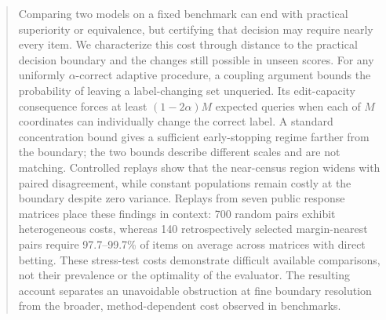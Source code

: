 \begin{abstract}
Comparing two models on a fixed benchmark can end with practical superiority or equivalence, but certifying that decision may require nearly every item. We characterize this cost through distance to the practical decision boundary and the changes still possible in unseen scores. For any uniformly \(\alpha\)-correct adaptive procedure, a coupling argument bounds the probability of leaving a label-changing set unqueried. Its edit-capacity consequence forces at least \((1-2\alpha)M\) expected queries when each of \(M\) coordinates can individually change the correct label. A standard concentration bound gives a sufficient early-stopping regime farther from the boundary; the two bounds describe different scales and are not matching. Controlled replays show that the near-census region widens with paired disagreement, while constant populations remain costly at the boundary despite zero variance. Replays from seven public response matrices place these findings in context: 700 random pairs exhibit heterogeneous costs, whereas 140 retrospectively selected margin-nearest pairs require 97.7--99.7\% of items on average across matrices with direct betting. These stress-test costs demonstrate difficult available comparisons, not their prevalence or the optimality of the evaluator. The resulting account separates an unavoidable obstruction at fine boundary resolution from the broader, method-dependent cost observed in benchmarks.
\end{abstract}
